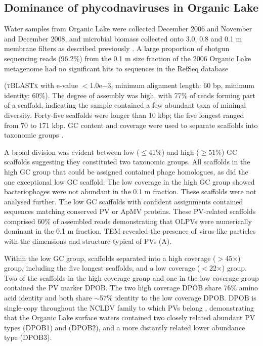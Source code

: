 \subsection{Dominance of phycodnaviruses in Organic Lake}
Water samples from Organic Lake were collected December 2006 and November and December 2008, and microbial biomass collected onto 3.0, 0.8 and 0.1 \textmu{}m membrane filters as described previously \cite{Lauro2011}. 
A large proportion of shotgun sequencing reads (96.2\%) from the 0.1 \textmu{}m size fraction of the 2006 Organic Lake metagenome  had no significant hits to sequences in the RefSeq database 

(\textsc{tBLASTx} with e-value $<$1.0e$-$3, minimum alignment length: 60 bp, minimum identity: 60\%). 
The degree of assembly was high, with 77\% of reads forming part of a scaffold, indicating the sample contained a few abundant taxa of minimal diversity. 
Forty-five scaffolds were longer than 10 kbp; the five longest ranged from 70 to 171 kbp. 
GC content and coverage were used to separate scaffolds into taxonomic groups .
 
A broad division was evident between low ($\le$41\%) and high ($\ge$51\%) GC scaffolds suggesting they constituted two taxonomic groups. 
All scaffolds in the high GC group that could be assigned contained phage homologues, as did the one exceptional low GC scaffold. 
The low coverage in the high GC group showed bacteriophages were not abundant in the 0.1 \textmu{}m fraction. 
These scaffolds were not analysed further. 
The low GC scaffolds with confident assignments contained sequences matching conserved \ac{PV} or \ac{ApMV} proteins. 
These \ac{PV}-related scaffolds comprised 60\% of assembled reads demonstrating that \acp{OLPV} were numerically dominant in the 0.1 \textmu{}m fraction. 
\ac{TEM} revealed the presence of virus-like particles with the dimensions and structure typical of PVs (A).


Within the low GC group, scaffolds separated into a high coverage ($>$45$\times$) group, including the five longest scaffolds, and a low coverage ($<$22$\times$) group. 
Two of the scaffolds in the high coverage group and one in the low coverage group contained the \ac{PV} marker \ac{DPOB}. 
The two high coverage \ac{DPOB} share 76\% amino acid identity and both share $\sim$57\% identity to the low coverage \ac{DPOB}. 
\ac{DPOB} is single-copy throughout the \ac{NCLDV} family to which \acp{PV} belong \cite{Iyer2001, Iyer2006}, 
demonstrating that the Organic Lake surface waters contained two closely related abundant \ac{PV} types (\ac{DPOB}1) and (\ac{DPOB}2), and a more distantly related lower abundance type (\ac{DPOB}3). 

